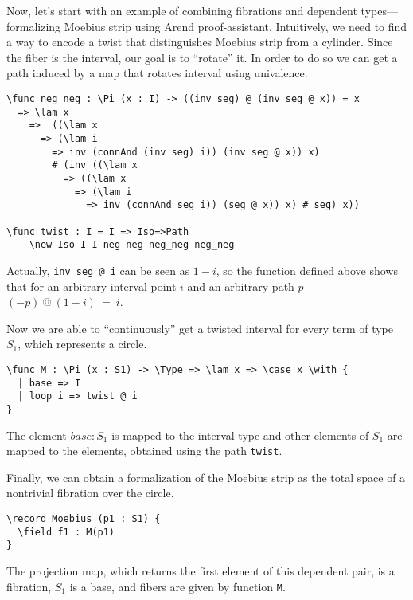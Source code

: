 Now, let's start with an example of combining fibrations and dependent types---formalizing Moebius strip using Arend proof-assistant.
Intuitively, we need to find a way to encode a twist that distinguishes Moebius strip from a cylinder. Since the fiber is the interval, our goal is to ``rotate'' it. In order to do so we can get a path induced by a map that rotates interval using univalence. 
 
\begin{ListingEnv}[H]
\begin{lstlisting}
\func neg_neg : \Pi (x : I) -> ((inv seg) @ (inv seg @ x)) = x 
  => \lam x 
    =>  ((\lam x 
      => (\lam i 
        => inv (connAnd (inv seg) i)) (inv seg @ x)) x)
        # (inv ((\lam x 
          => ((\lam x 
            => (\lam i 
              => inv (connAnd seg i)) (seg @ x)) x) # seg) x))

\func twist : I = I => Iso=>Path
    \new Iso I I neg neg neg_neg neg_neg
\end{lstlisting}
\end{ListingEnv}

Actually, \texttt{inv seg @ i} can be seen as $1-i$, so the function defined above shows that for an arbitrary interval point $i$ and an arbitrary path $p$ $(-p)\ @\ (1-i)\ =\ i$.

Now we are able to ``continuously'' get a twisted interval for every term of type $S_1$, which represents a circle.

\begin{ListingEnv}[H]
\begin{lstlisting}
\func M : \Pi (x : S1) -> \Type => \lam x => \case x \with {
  | base => I
  | loop i => twist @ i
}
\end{lstlisting}
\end{ListingEnv}

The element $base : S_1$ is mapped to the interval type and other elements of $S_1$ are mapped to the elements, obtained using the path \texttt{twist}.

Finally, we can obtain a formalization of the Moebius strip as the total space of a nontrivial fibration over the circle. 

\begin{ListingEnv}[H]
\begin{lstlisting}
\record Moebius (p1 : S1) {
  \field f1 : M(p1)
}
\end{lstlisting}
\end{ListingEnv}

The projection map, which returns the first element of this dependent pair, is a fibration, $S_1$ is a base, and fibers are given by function \texttt{M}.

